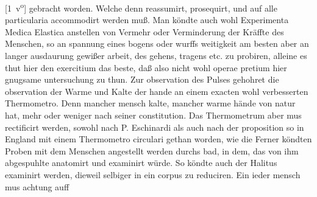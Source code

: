 [1~v\textsuperscript{o}]
gebracht worden.
%
Welche denn reassumirt, prosequirt, und auf alle particularia accommodirt werden mu{\ss}.
\pend%
\pstart%
Man k\"{o}ndte auch wohl Experimenta Medica Elastica\protect{} anstellen von Vermehr oder Verminderung der Kr\"{a}ffte des Menschen, so an spannung eines bogens oder wurffs weitig\-keit am besten aber an langer ausdaurung gewi{\ss}er arbeit,
des gehens, tragens etc. zu probiren, alleine es thut hier den exercitium das beste, da{\ss} also nicht wohl operae pretium hier gnugsame untersuchung zu thun.
\pend%
\pstart%
Zur observation des Pulses\protect{} gehohret die observation der Warme\protect{} und Kalte\protect{} der hande\protect{} an einem exacten wohl verbesserten Thermometro\protect{}. Denn mancher mensch kalte, mancher warme h\"{a}nde\protect{} von natur hat, mehr oder weniger nach seiner constitution\protect{}. 
\pend%
\pstart%
Das Thermometrum\protect{} aber mus rectificirt werden, sowohl nach P. Eschinardi\protect{}
%
als auch nach der proposition so in England\protect{} mit einem Thermometro\protect{} circulari gethan worden, wie die
%
\pend%
\pstart%
Ferner %
k\"{o}ndten Proben mit dem Menschen angestellt werden durchs bad, in dem, das von ihm abgespuhlte anatomirt und examinirt w\"{u}rde.
\pend%
\pstart%
So k\"{o}ndte auch der Halitus\protect{} examinirt werden, dieweil selbiger in ein corpus zu reduciren. 
\pend%
\pstart%
Ein ieder mensch mus achtung auff
